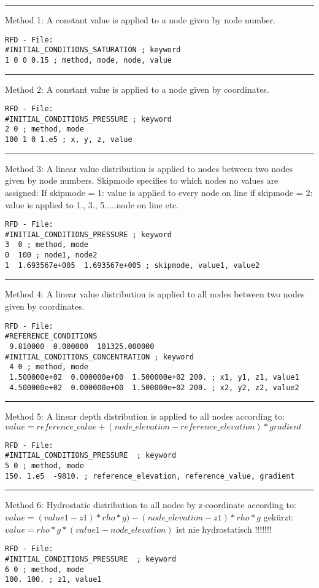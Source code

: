 \hrule
Method 1:
A constant value is applied to a node given by node number.
%
\small
\begin{verbatim}
RFD - File:
#INITIAL_CONDITIONS_SATURATION ; keyword
1 0 0 0.15 ; method, mode, node, value
\end{verbatim}
\normalsize

\hrule
Method 2:
A constant value is applied to a node given by coordinates.
%
\small
\begin{verbatim}
RFD - File:
#INITIAL_CONDITIONS_PRESSURE ; keyword
2 0 ; method, mode
100 1 0 1.e5 ; x, y, z, value
\end{verbatim}
\normalsize

\hrule
Method 3:
A linear value distribution is applied to nodes between two nodes given by
node numbers. Skipmode specifies to which nodes no values are assigned:\newline
If skipmode = 1: value is applied to every node on line \newline
if skipmode = 2: value is applied to 1., 3., 5.....node on line etc.
%
\small
\begin{verbatim}
RFD - File:
#INITIAL_CONDITIONS_PRESSURE ; keyword
3  0 ; method, mode
0  100 ; node1, node2
1  1.693567e+005  1.693567e+005 ; skipmode, value1, value2
\end{verbatim}
\normalsize

\hrule
Method 4:
A linear value distribution is applied to all nodes between two nodes given by
coordinates.
%
\small
\begin{verbatim}
RFD - File:
#REFERENCE_CONDITIONS
 9.810000  0.000000  101325.000000
#INITIAL_CONDITIONS_CONCENTRATION ; keyword
 4 0 ; method, mode
 1.500000e+02  0.000000e+00  1.500000e+02 200. ; x1, y1, z1, value1
 4.500000e+02  0.000000e+00  1.500000e+02 200. ; x2, y2, z2, value2
\end{verbatim}
\normalsize

\hrule
Method 5:
A linear depth distribution is applied to all nodes according to: \newline
$value = reference\_value + (node\_elevation - reference\_elevation) * gradient$
%
\small
\begin{verbatim}
RFD - File:
#INITIAL_CONDITIONS_PRESSURE  ; keyword
5 0 ; method, mode
150. 1.e5  -9810. ; reference_elevation, reference_value, gradient
\end{verbatim}
\normalsize

\hrule
Method 6:
Hydrostatic distribution to all nodes by z-coordinate according to: \newline
$value = (value1 - z1)*rho*g) - (node\_elevation - z1)*rho*g$ \newline
gek\"{u}rzt: $value = rho * g * (value1 - node\_elevation)$ \newline
ist nie hydrostatisch !!!!!!!
%
\small
\begin{verbatim}
RFD - File:
#INITIAL_CONDITIONS_PRESSURE  ; keyword
6 0 ; method, mode
100. 100. ; z1, value1
\end{verbatim}
\normalsize

